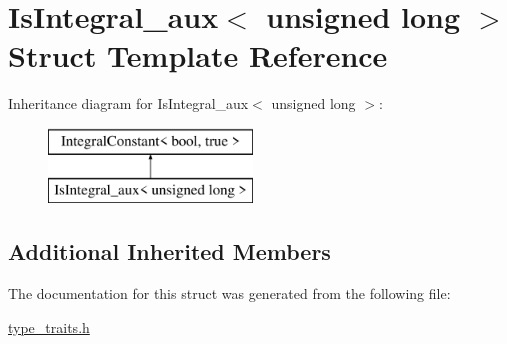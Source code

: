 \hypertarget{struct_is_integral__aux_3_01unsigned_01long_01_4}{}\section{Is\+Integral\+\_\+aux$<$ unsigned long $>$ Struct Template Reference}
\label{struct_is_integral__aux_3_01unsigned_01long_01_4}
Inheritance diagram for Is\+Integral\+\_\+aux$<$ unsigned long $>$\+:\begin{figure}[H]
\begin{center}
\leavevmode
\includegraphics[height=2.000000cm]{struct_is_integral__aux_3_01unsigned_01long_01_4}
\end{center}
\end{figure}
\subsection*{Additional Inherited Members}


The documentation for this struct was generated from the following file\+:\begin{DoxyCompactItemize}
\item 
\hyperlink{type__traits_8h}{type\+\_\+traits.\+h}\end{DoxyCompactItemize}
